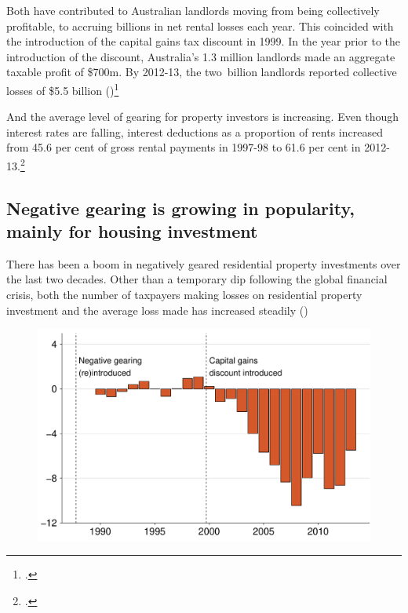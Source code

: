 \documentclass{grattan}\usepackage[]{graphicx}\usepackage[]{color}
\begin{document}
Both have contributed to Australian landlords moving from being collectively profitable, to accruing billions in net rental losses each year. This coincided with the introduction of the capital gains tax discount in 1999. In the year prior to the introduction of the discount, Australia's 1.3 million landlords made an aggregate taxable profit of \$700m. By 2012-13, the two~billion landlords reported collective losses of \$5.5 billion ()\footcites{Eslake2013}{Treasury2015a}





And the average level of gearing for property investors is increasing. Even though interest rates are falling, interest deductions as a proportion of rents increased from 45.6 per cent of gross rental payments in 1997-98 to 61.6 per cent in 2012-13.\footcite[p.~65]{Treasury2015a}


\subsection{Negative gearing is growing in popularity, mainly for housing investment}
There has been a boom in negatively geared residential property investments over the last two decades. Other than a temporary dip following the global financial crisis, both the number of taxpayers making losses on residential property investment and the average loss made has increased steadily ()


\begin{figure}[t]
\includegraphics[width=\columnwidth]{figure/Net_rent_over_time-1}

\end{figure}
\end{document}
